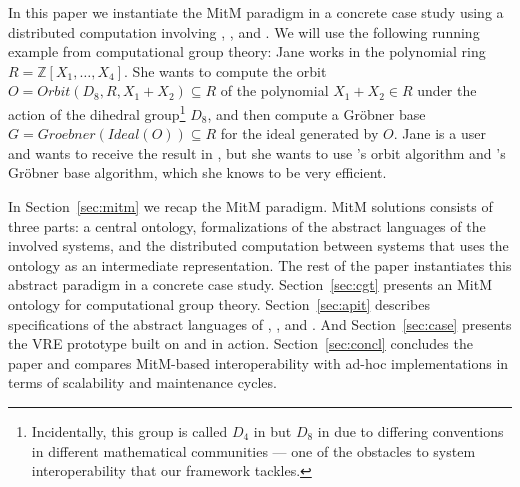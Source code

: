 In this paper we instantiate the MitM paradigm in a concrete case study using a distributed computation involving \GAP, \Sage, and \Singular.
We will use the following running example from computational group theory: Jane works in the polynomial ring $R=\mathbb{Z}[X_1,\ldots,X_4]$.
She wants to compute the orbit $O=Orbit(D_8,R,X_1+X_2)\subseteq R$ of the polynomial $X_1+X_2\in R$ under the action of the dihedral group\footnote{Incidentally, this group is called $D_4$ in \Sage but $D_8$ in \GAP due to differing conventions in different mathematical communities --- one of the obstacles to system interoperability that our framework tackles.} $D_8$, and then compute a Gr\"obner base $G=Groebner(Ideal(O))\subseteq R$ for the ideal generated by $O$.
Jane is a \Sage user and wants to receive the result in \Sage, but she wants to use \GAP's orbit algorithm and \Singular's Gr\"obner base algorithm, which she knows to be very efficient.

In Section~\ref{sec:mitm} we recap the MitM paradigm.
MitM solutions consists of three parts: a central ontology, formalizations of the abstract languages of the involved systems, and the distributed computation between systems that uses the ontology as an intermediate representation.
The rest of the paper instantiates this abstract paradigm in a concrete case study.
Section~\ref{sec:cgt} presents an MitM ontology for computational group theory.
Section~\ref{sec:apit} describes specifications of the abstract languages of \GAP, \Sage, and \Singular.
And Section~\ref{sec:case} presents the VRE prototype built on \GAP and \Singular in action.
Section~\ref{sec:concl} concludes the paper and compares MitM-based interoperability with ad-hoc implementations in terms of scalability and maintenance cycles. 


